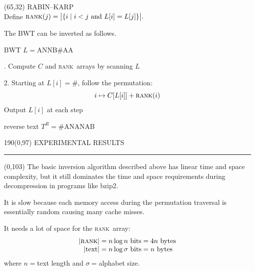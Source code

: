 \documentclass[a4paper]{article} %
\newcommand{\eos}{\#}
\newcommand{\rank}{\textsc{rank}}
\begin{document}
\begin{textblock}{60}(65,32)
  {\sffamily\normalsize{\color{sciorange}RABIN--KARP}}\vspace{1mm}\\
  \footnotesize 
  Define
  $
    \rank(j)=\big|\{i \mid i<j \textrm{ and }
    L[i]=L[j]\}\big|.
  $

The BWT can be inverted as follows.
\vspace{3mm}

\scriptsize\sffamily
{} BWT $L={}$ANNB\eos AA
\vspace{2mm}

\quad\begin{minipage}{55mm}
\scriptsize{}. Compute $C$ and \rank\ arrays by scanning $L$
\scriptsize\sffamily
\begin{center}
\hspace*{-5mm}  
\end{center}
2. Starting at $L[i]={}$\eos, follow the permutation:
\[
i \mapsto C[L[i]]+\rank(i)
\]
\hspace{2.3mm}Output $L[i]$ at each step
\end{minipage}
\vspace{2mm}

\scriptsize\sffamily
{} reverse text $T^R={}$\eos ANANAB

\end{textblock}



\begin{textblock}{190}(0,97)
\sffamily
\Large{\color{sciorange}EXPERIMENTAL RESULTS}\small\\
\rule[3mm]{190mm}{0.1pt}
\end{textblock} 


\begin{textblock}{60}(0,103) 
  \footnotesize 
  The basic inversion algorithm described above has linear time and
  space complexity, but it still dominates the time and space
  requirements during decompression in programs like bzip2.
  \vspace{1mm}

  It is slow because each memory access during the permutation 
  traversal is essentially random causing many cache misses.
  \vspace{1mm}

  It needs a lot of space for the \rank\ array:
  \begin{align*}
    |\rank| &= n\log n \textrm{ bits} = 4n \textrm{ bytes}\\[-1mm]
    |\textrm{text}| &= n\log\sigma \textrm{ bits} = n \textrm{ bytes}
  \end{align*}
  where $n={}$text length and $\sigma={}$alphabet size.
\end{textblock}
\end{document}

